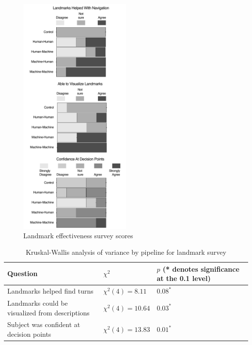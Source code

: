 \begin{figure}[htbp]
  \centering
  \includegraphics[width=0.5\textwidth]{images/plot_likert.pdf}
  \caption{Landmark effectiveness survey scores}
  \label{fig:plot:likert}
\end{figure}

\begin{table}[htbp]
  \centering
  \caption{Kruskal-Wallis analysis of variance by pipeline for landmark survey}
  \label{tab:likert}
  {\tabulinesep=2mm
    \begin{singlespace}
    \begin{tabu} to \textwidth{|X[c]|X[c]|X[c]|}
        \hline
         Question & $\chi^2$ & $p$ (* denotes significance at the 0.1 level) \\
        \hline\hline
        Landmarks helped find turns & $\chi^2(4) = 8.11$ & $0.08^*$ \\
        \hline
        Landmarks could be visualized from descriptions & $\chi^2(4) = 10.64$ & $0.03^*$ \\
        \hline
        Subject was confident at decision points & $\chi^2(4) = 13.83$ & $0.01^*$ \\
    \hline
    \end{tabu}
    \end{singlespace}
    }
\end{table}

